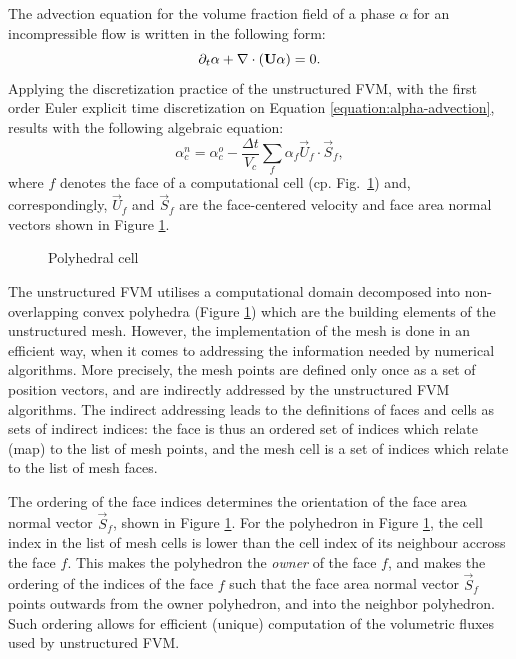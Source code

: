 \label{section:geometry} The advection equation for the volume fraction field
of a phase $\alpha$ for an incompressible flow is written in the following
form:
%
\begin{equation}
  \partial_t{\alpha} + \nabla \cdot {(\ensuremath{\mathbf U}\alpha)} = 0. 
  \label{equation:alpha-advection}
\end{equation}
%
Applying the discretization practice of the unstructured FVM, with the first
order Euler explicit time discretization on Equation
\ref{equation:alpha-advection}, results with the following algebraic equation: 
%
\begin{equation}
  \alpha_{c}^n = \alpha_{c}^o - \frac{\Delta t}{V_c} 
  \sum_f  \alpha_{f} \vec{U}_f \cdot \vec{S}_f, 
  \label{equation:alpha-discrete}
\end{equation}
%
where $f$ denotes the face of a computational cell (cp. Fig.\ 
\ref{fig:polyhedralCell-FVM}) and, correspondingly, $\vec{U}_f$ and 
$\vec{S}_f$ are the face-centered velocity and face area normal 
vectors shown in Figure \ref{fig:polyhedralCell-FVM}. 

\begin{figure}[h]
	\centering
    \def\svgwidth{0.4\columnwidth}
       {\footnotesize
        
       }
	\caption{Polyhedral cell}
	\label{fig:polyhedralCell-FVM}
\end{figure}

The unstructured FVM utilises a computational domain decomposed into
non-overlapping convex polyhedra (Figure \ref{fig:polyhedralCell-FVM}) which are the 
building elements of the unstructured mesh. However, the implementation of the mesh 
is done in an efficient way, when it comes to addressing the information needed by 
numerical algorithms. More precisely, the mesh points are defined only once as a 
set of position vectors, and are indirectly addressed by the unstructured FVM 
algorithms. The indirect addressing leads to the definitions of faces and cells 
as sets of indirect indices: the face is thus an ordered set of indices which 
relate (map) to the list of mesh points, and the mesh cell is a set of indices 
which relate to the list of mesh faces. 

The ordering of the face indices determines the orientation of the face area
normal vector $\vec{S}_f$, shown in Figure \ref{fig:polyhedralCell-FVM}. For
the polyhedron in Figure \ref{fig:polyhedralCell-FVM}, the cell index in the
list of mesh cells is lower than the cell index of its neighbour accross the
face $f$. This makes the polyhedron the \emph{owner} of the face $f$, and makes
the ordering of the indices of the face $f$ such that the face area normal vector
$\vec{S}_f$ points outwards from the owner polyhedron, and into the neighbor polyhedron.
Such ordering allows for efficient (unique) computation of the volumetric
fluxes used by unstructured FVM. 

